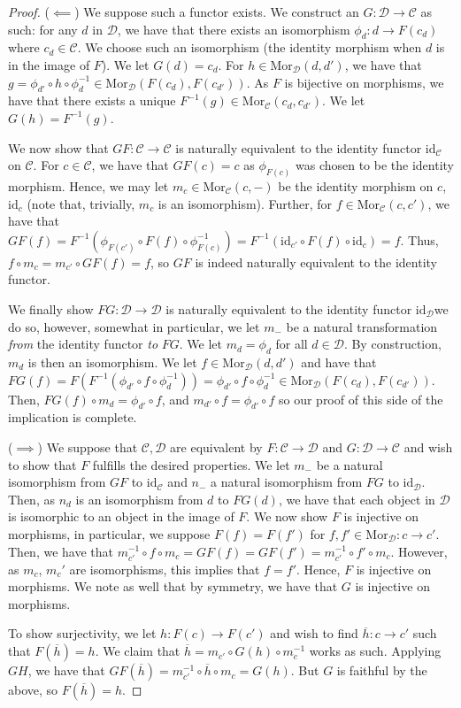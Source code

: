 \documentclass[english]{article}
\newcommand{\mor}{\mathrm{Mor}}
\newcommand{\Dcal}{\mathcal{D}}
\newcommand{\Ccal}{\mathcal{C}}
\theoremstyle{remark}
\theoremstyle{definition}
\newcommand{\cl}{\overline}
\newcommand{\id}{\mathrm{id}}
\begin{document}
\begin{proof}
($\impliedby$) We suppose such a functor exists. We construct an  $G:\Dcal\to \Ccal$ as such: for any $d$ in $\Dcal$, we have that there exists an isomorphism $\phi_d:d\to F(c_d)$ where $c_d\in \Ccal$. We choose such an isomorphism (the identity morphism when $d$ is in the image of $F$). We let $G(d)=c_d$. For $h\in \mor_\Dcal(d,d')$, we have that $g=\phi_{d'}\circ h\circ\phi_d^{-1}\in \mor_\Dcal(F(c_d),F(c_{d'}))$. As $F$ is bijective on morphisms, we have that there exists a unique $F^{-1}(g)\in \mor_\Ccal(c_d,c_{d'})$. We let $G(h)=F^{-1}(g)$.

We now show that $GF:\Ccal\to \Ccal$ is naturally equivalent to the identity functor $\id_{\Ccal}$ on $\Ccal$.
 For $c\in \Ccal$, we have that $GF(c)=c$ as $\phi_{F(c)}$ was chosen to be the identity morphism.
  Hence, we may let $m_c\in \mor_\Ccal(c,-)$ be the identity morphism on $c$, $\id_c$ (note that, trivially, $m_c$ is an isomorphism). Further, for $f\in \mor_\Ccal(c,c')$, we have that $GF(f)=F^{-1}(\phi_{F(c')}\circ F(f)\circ \phi_{F(c)}^{-1})=F^{-1}(\id_{c'}\circ F(f)\circ \id_{c})=f$. Thus, $f\circ m_c=m_{c'}\circ GF(f)=f$, so $GF$ is indeed naturally equivalent to the identity functor.

We finally show $FG:\Dcal\to \Dcal$ is naturally equivalent to the identity functor $\id_{\Dcal}$\textemdash we do so, however, somewhat \textemdash in particular, we let $m_{-}$ be a natural transformation \emph{from} the identity functor \emph{to} $FG$. We let $m_d=\phi_d$ for all $d\in \Dcal$. By construction, $m_d$ is then an isomorphism. We let $f\in \mor_\Dcal(d,d')$ and have that $FG(f)=F(F^{-1}(\phi_{d'}\circ f \circ \phi_{d}^{-1}))=\phi_{d'}\circ f \circ \phi_d^{-1}\in \mor_\Dcal(F(c_{d}),F(c_{d'}))$.  Then, $FG(f)\circ m_d=\phi_{d'}\circ f$, and $m_{d'}\circ f=\phi_{d'}\circ f$ so our proof of this side of the implication is complete.

($\implies$) We suppose that $\Ccal,\Dcal$ are equivalent by $F:\Ccal\to \Dcal$ and $G:\Dcal \to \Ccal$ and wish to show that $F$ fulfills the desired properties. We let $m_-$ be a natural isomorphism from $GF$ to $\id_\Ccal$ and $n_-$ a natural isomorphism from $FG$ to $\id_{\Dcal}$. Then, as $n_d$ is an isomorphism from $d$ to $FG(d)$, we have that each object in $\Dcal$ is isomorphic to an object in the image of $F$. We now show $F$ is injective on morphisms, in particular, we suppose $F(f)=F(f')$ for $f,f'\in \mor_\Dcal:c\to c'$. Then, we have that $m_{c'}^{-1}\circ f\circ m_c=GF(f)=GF(f')=m_{c'}^{-1}\circ f'\circ m_c$. However, as $m_c$, $m_c'$ are isomorphisms, this implies that $f=f'$. Hence, $F$ is injective on morphisms. We note as well that by symmetry, we have that $G$ is injective on morphisms.

To show surjectivity, we let $h:F(c)\to F(c')$ and wish to find $\cl{h}:c\to c'$ such that $F(\cl{h})=h$. We claim that $\cl{h}=m_{c'}\circ G(h)\circ m_{c}^{-1}$ works as such. Applying $GH$, we have that $GF(\cl h)=m_{c'}^{-1}\circ\cl h\circ m_{c}=G(h)$. But $G$ is faithful by the above, so $F(\cl h)=h$.
\end{proof}
\end{document}
